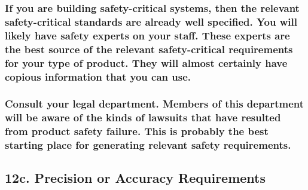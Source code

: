 \documentclass[
]{article}
\begin{document}
\hypertarget{if-you-are-building-safety-critical-systems-then-the-relevant-safety-critical-standards-are-already-well-specified.-you-will-likely-have-safety-experts-on-your-staff.-these-experts-are-the-best-source-of-the-relevant-safety-critical-requirements-for-your-type-of-product.-they-will-almost-certainly-have-copious-information-that-you-can-use.}{%
\subsubsection{\texorpdfstring{ If you are building safety-critical
systems, then the relevant safety-critical standards are already well
specified. You will likely have safety experts on your staff. These
experts are the best source of the relevant safety-critical requirements
for your type of product. They will almost certainly have copious
information that you can
use.}{ If you are building safety-critical systems, then the relevant safety-critical standards are already well specified. You will likely have safety experts on your staff. These experts are the best source of the relevant safety-critical requirements for your type of product. They will almost certainly have copious information that you can use.}}\label{if-you-are-building-safety-critical-systems-then-the-relevant-safety-critical-standards-are-already-well-specified.-you-will-likely-have-safety-experts-on-your-staff.-these-experts-are-the-best-source-of-the-relevant-safety-critical-requirements-for-your-type-of-product.-they-will-almost-certainly-have-copious-information-that-you-can-use.}}

\hypertarget{consult-your-legal-department.-members-of-this-department-will-be-aware-of-the-kinds-of-lawsuits-that-have-resulted-from-product-safety-failure.-this-is-probably-the-best-starting-place-for-generating-relevant-safety-requirements.}{%
\subsubsection{Consult your legal department. Members of this department
will be aware of the kinds of lawsuits that have resulted from product
safety failure. This is probably the best starting place for generating
relevant safety
requirements.}\label{consult-your-legal-department.-members-of-this-department-will-be-aware-of-the-kinds-of-lawsuits-that-have-resulted-from-product-safety-failure.-this-is-probably-the-best-starting-place-for-generating-relevant-safety-requirements.}}

\hypertarget{c.-precision-or-accuracy-requirements}{%
\subsection{12c. Precision or Accuracy
Requirements}\label{c.-precision-or-accuracy-requirements}}
\end{document}
